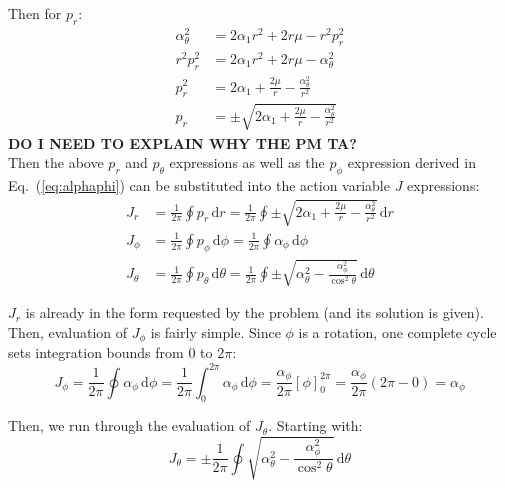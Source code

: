 \documentclass[titlepage]{article}
\begin{document}
Then for $p_r$:
\begin{equation}
	\begin{split}
		\alpha_\theta^2&=2\alpha_1r^2+2r\mu-r^2p_r^2 \\
		r^2p_r^2&=2\alpha_1r^2+2r\mu-\alpha_\theta^2 \\
		p_r^2&=2\alpha_1+\frac{2\mu}{r}-\frac{\alpha_\theta^2}{r^2} \\
		p_r&=\pm\sqrt{2\alpha_1+\frac{2\mu}{r}-\frac{\alpha_\theta^2}{r^2}}
	\end{split}
\end{equation}
\textbf{DO I NEED TO EXPLAIN WHY THE PM TA?} \\

Then the above $p_r$ and $p_\theta$ expressions as well as the $p_\phi$ expression derived in Eq.~(\ref{eq:alphaphi}) can be substituted into the action variable $J$ expressions:
\begin{equation}
	\begin{split}
		J_r&=\frac{1}{2\pi}\oint p_r\,\mathrm{d}r=\frac{1}{2\pi}\oint\pm\sqrt{2\alpha_1+\frac{2\mu}{r}-\frac{\alpha_\theta^2}{r^2}}\,\mathrm{d}r \\
		J_\phi&=\frac{1}{2\pi}\oint p_\phi\,\mathrm{d}\phi=\frac{1}{2\pi}\oint\alpha_\phi\,\mathrm{d}\phi \\
		J_\theta&=\frac{1}{2\pi}\oint p_\theta\,\mathrm{d}\theta=\frac{1}{2\pi}\oint\pm\sqrt{\alpha_\theta^2-\frac{\alpha_\phi^2}{\cos^2\theta}}\,\mathrm{d}\theta
	\end{split}
	\label{eq:actionvars}
\end{equation}

$J_r$ is already in the form requested by the problem (and its solution is given). Then, evaluation of $J_\phi$ is fairly simple. Since $\phi$ is a rotation, one complete cycle sets integration bounds from $0$ to $2\pi$:
\begin{equation}
	J_\phi=\frac{1}{2\pi}\oint\alpha_\phi\,\mathrm{d}\phi=\frac{1}{2\pi}\int_0^{2\pi}\alpha_\phi\,\mathrm{d}\phi=\frac{\alpha_\phi}{2\pi}\left[\phi\right]_0^{2\pi}=\frac{\alpha_\phi}{2\pi}\left(2\pi-0\right)=\alpha_\phi
	\label{eq:actionphi}
\end{equation}

Then, we run through the evaluation of $J_\theta$. Starting with:
\begin{equation}
	J_\theta=\pm\frac{1}{2\pi}\oint\sqrt{\alpha_\theta^2-\frac{\alpha_\phi^2}{\cos^2\theta}}\,\mathrm{d}\theta
\end{equation}
\end{document}
